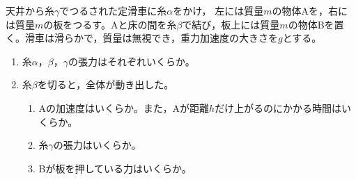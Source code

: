 \item
        \begin{mawarikomi}{80pt}{}
            天井から糸$\gamma $でつるされた定滑車に糸$\alpha$をかけ，
            左には質量$m$の物体Aを，右には質量$m$の板をつるす。Aと床の間を糸$\beta $で結び，板上には質量$m$の物体Bを置く。滑車は滑らかで，質量は無視でき，重力加速度の大きさを$g$とする。
            \begin{enumerate}
                \item 糸$\alpha$，$\beta $，$\gamma $の張力はそれぞれいくらか。
                \item 糸$\beta $を切ると，全体が動き出した。
                    \begin{enumerate}[(ア)]
                        \item Aの加速度はいくらか。また，Aが距離$h$だけ上がるのにかかる時間はいくらか。
                        \item 糸$\gamma$の張力はいくらか。
                        \item Bが板を押している力はいくらか。
                    \end{enumerate}
            \end{enumerate}     
        \end{mawarikomi}
